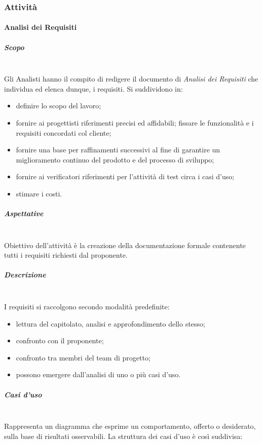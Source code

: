 	\subsubsection{Attività}
		\paragraph{Analisi dei Requisiti}
			\subparagraph{Scopo} \mbox{}\\
			Gli Analisti hanno il compito di redigere il documento di
			\textit{Analisi dei Requisiti} che individua ed elenca dunque, i requisiti.
			Si suddividono in:
			\begin{itemize}
				\item definire lo scopo del lavoro;
				\item fornire ai progettisti riferimenti precisi ed affidabili;
				fissare le funzionalità e i requisiti concordati col cliente;
				\item fornire  una  base  per  raffinamenti  successivi  al  fine  di  garantire  un miglioramento continuo del prodotto e del processo di sviluppo;
				\item fornire ai verificatori riferimenti per l'attività di test circa i casi d'uso;
				\item stimare i costi.
			\end{itemize}
			\subparagraph{Aspettative} \mbox{}\\
			Obiettivo dell'attività è la creazione della documentazione formale contenente tutti i
			requisiti richiesti dal proponente.
			\subparagraph{Descrizione} \mbox{}\\
			I requisiti si raccolgono secondo modalità predefinite:
			\begin{itemize}
				\item lettura del capitolato, analisi e approfondimento dello stesso;
				\item confronto con il proponente;
				\item confronto tra membri del team di progetto;
				\item possono emergere dall'analisi di uno o più casi d'uso.
			\end{itemize}
			\subparagraph{Casi d'uso} \mbox{}\\
			Rappresenta un diagramma che esprime un comportamento,
			offerto o desiderato, sulla base di risultati osservabili.
			La struttura dei casi d'uso è così suddivisa:
